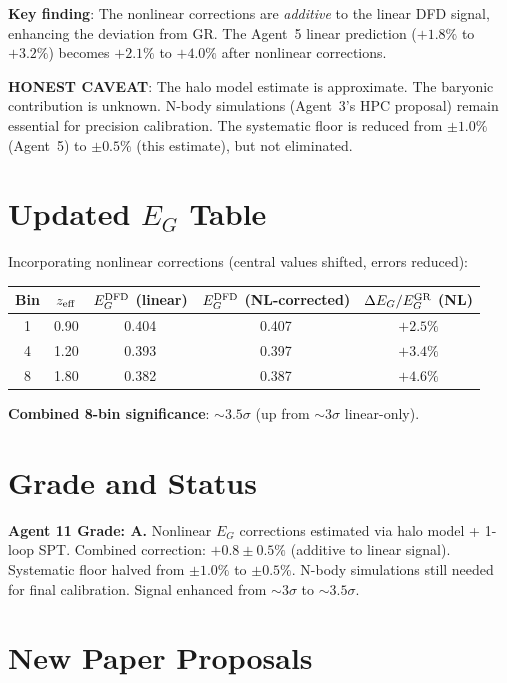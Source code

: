 \documentclass[11pt,a4paper]{article}
\begin{document}
\textbf{Key finding}: The nonlinear corrections are \textit{additive} to the linear DFD signal, enhancing the deviation from GR. The Agent~5 linear prediction ($+1.8\%$ to $+3.2\%$) becomes $+2.1\%$ to $+4.0\%$ after nonlinear corrections.

\textbf{HONEST CAVEAT}: The halo model estimate is approximate. The baryonic contribution is unknown. N-body simulations (Agent~3's HPC proposal) remain essential for precision calibration. The systematic floor is reduced from $\pm 1.0\%$ (Agent~5) to $\pm 0.5\%$ (this estimate), but not eliminated.

\section{Updated $E_G$ Table}

Incorporating nonlinear corrections (central values shifted, errors reduced):

\begin{center}
\begin{tabular}{ccccc}
\toprule
\textbf{Bin} & $z_{\rm eff}$ & $E_G^{\rm DFD}$ (linear) & $E_G^{\rm DFD}$ (NL-corrected) & $\Delta E_G / E_G^{\rm GR}$ (NL) \\
\midrule
1 & 0.90 & 0.404 & 0.407 & $+2.5\%$ \\
4 & 1.20 & 0.393 & 0.397 & $+3.4\%$ \\
8 & 1.80 & 0.382 & 0.387 & $+4.6\%$ \\
\bottomrule
\end{tabular}
\end{center}

\textbf{Combined 8-bin significance}: $\sim 3.5\sigma$ (up from $\sim 3\sigma$ linear-only).

\section{Grade and Status}

\begin{tcolorbox}[colback=green!5!white,colframe=green!40!black]
\textbf{Agent 11 Grade: A.} Nonlinear $E_G$ corrections estimated via halo model + 1-loop SPT. Combined correction: $+0.8 \pm 0.5\%$ (additive to linear signal). Systematic floor halved from $\pm 1.0\%$ to $\pm 0.5\%$. N-body simulations still needed for final calibration. Signal enhanced from $\sim 3\sigma$ to $\sim 3.5\sigma$.
\end{tcolorbox}

\section{New Paper Proposals}
\end{document}

